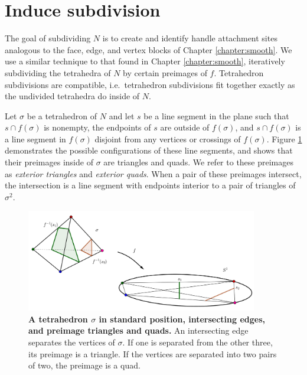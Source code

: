 \section{Induce subdivision}
\label{section:pl-subdivide}

The goal of subdividing $N$ is to create and identify handle attachment sites analogous to the face, edge, and vertex blocks of Chapter \ref{chapter:smooth}.
We use a similar technique to that found in Chapter \ref{chapter:smooth}, iteratively subdividing the tetrahedra of $N$ by certain preimages of $f$.
Tetrahedron subdivisions are compatible, i.e.\ tetrahedron subdivisions fit together exactly as the undivided tetrahedra do inside of $N$.

Let $\sigma$ be a tetrahedron of $N$ and let $s$ be a line segment in the plane such that $s\cap f(\sigma)$ is nonempty, the endpoints of $s$ are outside of $f(\sigma)$,  and $s\cap f(\sigma)$ is a line segment in $f(\sigma)$ disjoint from any vertices or crossings of $f(\sigma)$.
Figure \ref{fig:standard-position-intersection} demonstrates the possible configurations of these line segments, and shows that their preimages inside of $\sigma$ are triangles and quads.
We refer to these preimages as \emph{exterior triangles} and \emph{exterior quads}.
When a pair of these preimages intersect, the intersection is a line segment with endpoints interior to a pair of triangles of $\sigma^2$.

\begin{figure}[h!]
	\centering
	\includegraphics[width=0.9\textwidth]{figures/standard-position-intersection.png}
	\caption{
		\textbf{A tetrahedron $\sigma$ in standard position, intersecting edges, and preimage triangles and quads.}
		An intersecting edge separates the vertices of $\sigma$.
		If one is separated from the other three, its preimage is a triangle.
		If the vertices are separated into two pairs of two, the preimage is a quad.
	}
	\label{fig:standard-position-intersection}
\end{figure}

